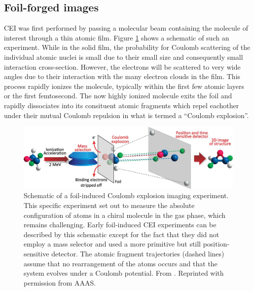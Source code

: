 
\subsection{Foil-forged images}
CEI was first performed by passing a molecular beam containing the molecule of interest through a thin atomic film. Figure \ref{fig:foilExperiment} shows a schematic of such an experiment. While in the solid film, the probability for Coulomb scattering of the individual atomic nuclei is small due to their small size and consequently small interaction cross-section. However, the electrons will be scattered to very wide angles due to their interaction with the many electron clouds in the film. This process rapidly ionizes the molecule, typically within the first few atomic layers or the first femtosecond. The now highly ionized molecule exits the foil and rapidly dissociates into its consituent atomic fragments which repel eachother under their mutual Coulomb repulsion in what is termed a ``Coulomb explosion''.

\begin{figure}[H]
  \centering
  \includegraphics[width=\textwidth]{gfx/FoilExperiment}
  \caption[Schematic of a foil-induced Coulomb explosion imaging experiment.]
  {Schematic of a foil-induced Coulomb explosion imaging experiment. This specific experiment set out to measure the absolute configuration of atoms in a chiral molecule in the gas phase, which remains challenging. Early foil-induced CEI experiments can be described by this schematic except for the fact that they did not employ a mass selector and used a more primitive but still position-sensitive detector. The atomic fragment trajectories (dashed lines) assume that no rearrangement of the atoms occurs and that the system evolves under a Coulomb potential. From \citet{Herwig13}. Reprinted with permission from AAAS.}
  \label{fig:foilExperiment}
\end{figure}

